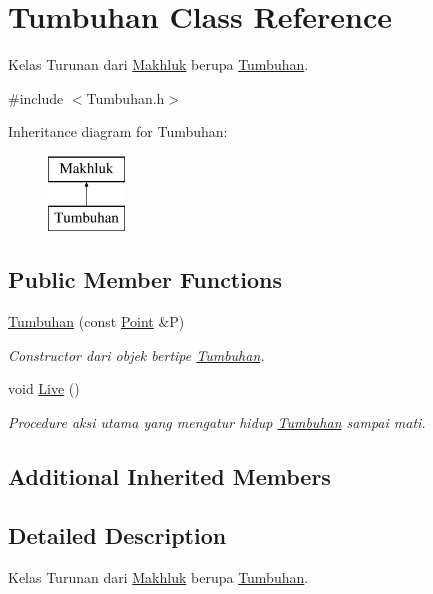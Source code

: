 \hypertarget{class_tumbuhan}{}\section{Tumbuhan Class Reference}
\label{class_tumbuhan}


Kelas Turunan dari \hyperlink{class_makhluk}{Makhluk} berupa \hyperlink{class_tumbuhan}{Tumbuhan}.  




{\ttfamily \#include $<$Tumbuhan.\+h$>$}

Inheritance diagram for Tumbuhan\+:\begin{figure}[H]
\begin{center}
\leavevmode
\includegraphics[height=2.000000cm]{class_tumbuhan}
\end{center}
\end{figure}
\subsection*{Public Member Functions}
\begin{DoxyCompactItemize}
\item 
\hyperlink{class_tumbuhan_a3095d94b67888eff7573c5e22620e550}{Tumbuhan} (const \hyperlink{class_point}{Point} \&P)
\begin{DoxyCompactList}\small\item\em Constructor dari objek bertipe \hyperlink{class_tumbuhan}{Tumbuhan}. \end{DoxyCompactList}\item 
void \hyperlink{class_tumbuhan_a18c42e3e111ea943eba9b4dee00ee96b}{Live} ()
\begin{DoxyCompactList}\small\item\em Procedure aksi utama yang mengatur hidup \hyperlink{class_tumbuhan}{Tumbuhan} sampai mati. \end{DoxyCompactList}\end{DoxyCompactItemize}
\subsection*{Additional Inherited Members}


\subsection{Detailed Description}
Kelas Turunan dari \hyperlink{class_makhluk}{Makhluk} berupa \hyperlink{class_tumbuhan}{Tumbuhan}. 

